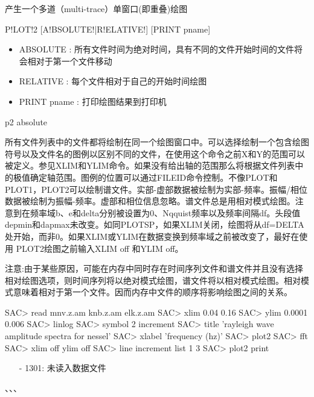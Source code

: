 \label{cmd:plot2}

产生一个多道（multi-trace）单窗口(即重叠)绘图

\begin{SACSTX}
P!LOT!2 [A!BSOLUTE!|R!ELATIVE!] [PRINT pname]
\end{SACSTX}

\begin{itemize}
\item ABSOLUTE : 所有文件时间为绝对时间，具有不同的文件开始时间的文件将会相对于第一个文件移动 
\item RELATIVE : 每个文件相对于自己的开始时间绘图 
\item PRINT {pname} : 打印绘图结果到打印机 
\end{itemize}

\begin{SACDFT}
p2 absolute
\end{SACDFT}

所有文件列表中的文件都将绘制在同一个绘图窗口中。可以选择绘制一个包含绘图符号以及文件名的图例以区别不同的文件，在使用这个命令之前X和Y的范围可以被定义。参见XLIM和YLIM命令。如果没有给出轴的范围那么将根据文件列表中的极值确定轴范围。图例的位置可以通过FILEID命令控制。不像PLOT和PLOT1，PLOT2可以绘制谱文件。实部-虚部数据被绘制为实部-频率。振幅/相位数据被绘制为振幅-频率。虚部和相位信息忽略。谱文件总是用相对模式绘图。注意到在频率域b、e和delta分别被设置为0、Nqquist频率以及频率间隔df。头段值depmin和dapmax未改变。如同PLOTSP，如果XLIM关闭，绘图将从df=DELTA处开始，而非0。如果XLIM或YLIM在数据变换到频率域之前被改变了，最好在使用	PLOT2绘图之前输入XLIM off 和YLIM off。

注意:由于某些原因，可能在内存中同时存在时间序列文件和谱文件并且没有选择相对绘图选项，则时间序列将以绝对模式绘图，谱文件将以相对模式绘图。相对模式意味着相对于第一个文件。因而内存中文件的顺序将影响绘图之间的关系。

\begin{SACCode}
SAC> read mnv.z.am knb.z.am elk.z.am
SAC> xlim 0.04 0.16
SAC> ylim 0.0001 0.006
SAC> linlog
SAC> symbol 2 increment
SAC> title 'rayleigh wave amplitude spectra for nessel'
SAC> xlabel 'frequency (hz)'
SAC> plot2
SAC> fft
SAC> xlim off ylim off
SAC> line increment list 1 3
SAC> plot2 print
\end{SACCode}

\begin{itemize}
\item[-]1301: 未读入数据文件
\end{itemize}

、、、
